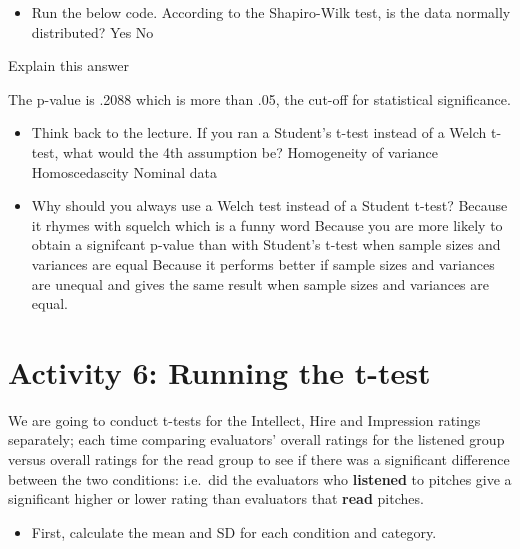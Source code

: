 \documentclass[]{book}
\newenvironment{Shaded}{\begin{snugshade}}{\end{snugshade}}
\newcommand{\DataTypeTok}[1]{\textcolor[rgb]{0.13,0.29,0.53}{#1}}
\newcommand{\KeywordTok}[1]{\textcolor[rgb]{0.13,0.29,0.53}{\textbf{#1}}}
\newcommand{\NormalTok}[1]{#1}
\newcommand{\OperatorTok}[1]{\textcolor[rgb]{0.81,0.36,0.00}{\textbf{#1}}}
\providecommand{\tightlist}{%
  \setlength{\itemsep}{0pt}\setlength{\parskip}{0pt}}
\begin{document}
\begin{itemize}
\tightlist
\item
  Run the below code. According to the Shapiro-Wilk test, is the data normally distributed? Yes No
\end{itemize}

\begin{Shaded}
\end{Shaded}

Explain this answer

The p-value is .2088 which is more than .05, the cut-off for statistical significance.

\begin{itemize}
\tightlist
\item
  Think back to the lecture. If you ran a Student's t-test instead of a Welch t-test, what would the 4th assumption be? Homogeneity of variance Homoscedascity Nominal data\\
\item
  Why should you always use a Welch test instead of a Student t-test? Because it rhymes with squelch which is a funny word Because you are more likely to obtain a signifcant p-value than with Student's t-test when sample sizes and variances are equal Because it performs better if sample sizes and variances are unequal and gives the same result when sample sizes and variances are equal.
\end{itemize}

\hypertarget{activity-6-running-the-t-test}{%
\section{Activity 6: Running the t-test}\label{activity-6-running-the-t-test}}

We are going to conduct t-tests for the Intellect, Hire and Impression ratings separately; each time comparing evaluators' overall ratings for the listened group versus overall ratings for the read group to see if there was a significant difference between the two conditions: i.e.~did the evaluators who \textbf{listened} to pitches give a significant higher or lower rating than evaluators that \textbf{read} pitches.

\begin{itemize}
\tightlist
\item
  First, calculate the mean and SD for each condition and category.
\end{itemize}
\end{document}
